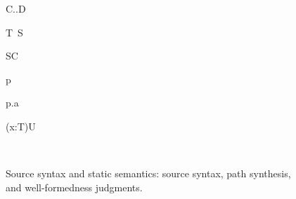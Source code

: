 \documentclass[acmsmall,screen,nonacm]{acmart}
\begin{document}
\begin{figure}[H]
\begin{minipage}[t]{0.50\linewidth}
\begin{minipage}[t]{0.66\linewidth}
  {\Gamma\vdash C..D\ \wf}
\end{minipage}
\end{minipage}

  {\Gamma\vdash T\ \wf\quad\Gamma\vdash S\ \wf}
\noindent
\begin{minipage}[t]{0.31\linewidth}
  {\Gamma\vdash S\capt C\ \wf}


\end{minipage}\hfill
\begin{minipage}[t]{0.32\linewidth}
  {\Gamma\vdash\sing p\ \wf}

  {\Gamma\vdash p.a\ \wf}
\end{minipage}\hfill
\begin{minipage}[t]{0.34\linewidth}
  {\Gamma\vdash(x:T)\to U\ \wf}

  {\Gamma\vdash{}\ \wf}
\end{minipage}

\caption{Source syntax and static semantics: source syntax, path synthesis,
and well-formedness judgments.}
\label{fig:syntax-wf}
\label{fig:path-synthesis}
\label{fig:well-formedness}
\end{figure}
\end{document}
